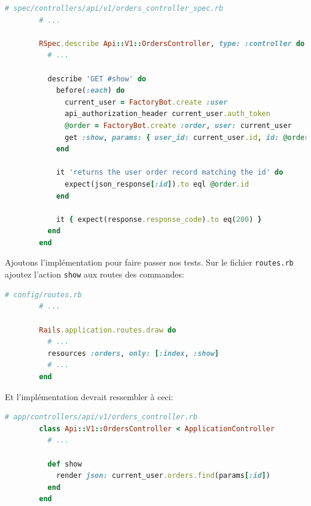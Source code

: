 \documentclass[]{report}
\begin{document}
      \begin{scriptsize}
        \begin{lstlisting}[language=ruby, caption={Test de l'affichage d'une commande}]
        # spec/controllers/api/v1/orders_controller_spec.rb
        # ...

        RSpec.describe Api::V1::OrdersController, type: :controller do
          # ...

          describe 'GET #show' do
            before(:each) do
              current_user = FactoryBot.create :user
              api_authorization_header current_user.auth_token
              @order = FactoryBot.create :order, user: current_user
              get :show, params: { user_id: current_user.id, id: @order.id }
            end

            it 'returns the user order record matching the id' do
              expect(json_response[:id]).to eql @order.id
            end

            it { expect(response.response_code).to eq(200) }
          end
        end
        \end{lstlisting}
      \end{scriptsize}

      Ajoutons l'implémentation pour faire passer nos tests. Sur le fichier \verb|routes.rb| ajoutez l'action \verb|show| aux routes des commandes:

      \begin{scriptsize}
        \begin{lstlisting}[language=ruby]
        # config/routes.rb
        # ...

        Rails.application.routes.draw do
          # ...
          resources :orders, only: [:index, :show]
          # ...
        end
        \end{lstlisting}
      \end{scriptsize}

      Et l'implémentation devrait ressembler à ceci:

      \begin{scriptsize}
        \begin{lstlisting}[language=ruby]
        # app/controllers/api/v1/orders_controller.rb
        class Api::V1::OrdersController < ApplicationController
          # ...

          def show
            render json: current_user.orders.find(params[:id])
          end
        end
        \end{lstlisting}
      \end{scriptsize}
\end{document}
